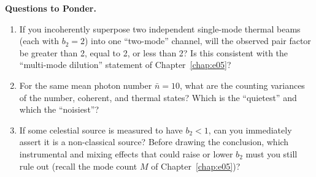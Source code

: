 \medskip
\noindent\textbf{Questions to Ponder.}
\begin{enumerate}
  \item If you incoherently superpose two independent single-mode thermal beams (each with \(b_2=2\)) into one ``two-mode'' channel, will the observed pair factor be greater than 2, equal to 2, or less than 2? Is this consistent with the ``multi-mode dilution'' statement of Chapter~\ref{chap:e05}?
  \item For the same mean photon number \(\bar n=10\), what are the counting variances of the number, coherent, and thermal states? Which is the ``quietest'' and which the ``noisiest''?
  \item If some celestial source is measured to have \(b_2<1\), can you immediately assert it is a non-classical source? Before drawing the conclusion, which instrumental and mixing effects that could raise or lower \(b_2\) must you still rule out (recall the mode count \(M\) of Chapter~\ref{chap:e05})?
\end{enumerate}
